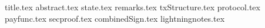 \documentclass[11pt]{llncs}
\begin{document}
{title.tex}
\thispagestyle{plain}
{abstract.tex}
{state.tex}
{remarks.tex}
{txStructure.tex}
{protocol.tex}
{payfunc.tex}
{secproof.tex}
{combinedSign.tex}
{lightningnotes.tex}

\end{document}
